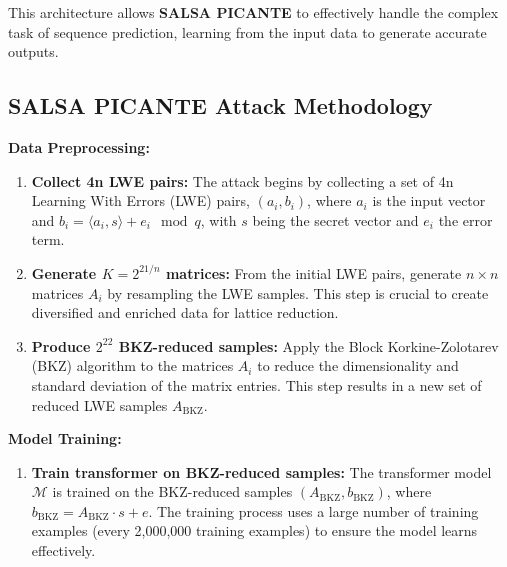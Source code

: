 \documentclass{article}
\begin{document}
This architecture allows \textbf{SALSA PICANTE} to effectively handle the complex task of sequence prediction, learning from the input data to generate accurate outputs.

\newpage 

\subsection*{SALSA PICANTE Attack Methodology}

\textbf{Data Preprocessing:}
\begin{enumerate}
    \item \textbf{Collect 4n LWE pairs:} The attack begins by collecting a set of 4n Learning With Errors (LWE) pairs, \((a_i, b_i)\), where \(a_i\) is the input vector and \(b_i = \langle a_i, s \rangle + e_i \mod q\), with \(s\) being the secret vector and \(e_i\) the error term.
    \item \textbf{Generate \(K = 2^{21/n}\) matrices:} From the initial LWE pairs, generate \(n \times n\) matrices \(A_i\) by resampling the LWE samples. This step is crucial to create diversified and enriched data for lattice reduction.
    \item \textbf{Produce \(2^{22}\) BKZ-reduced samples:} Apply the Block Korkine-Zolotarev (BKZ) algorithm to the matrices \(A_i\) to reduce the dimensionality and standard deviation of the matrix entries. This step results in a new set of reduced LWE samples \(A_{\text{BKZ}}\).
\end{enumerate}

\textbf{Model Training:}
\begin{enumerate}
    \item \textbf{Train transformer on BKZ-reduced samples:} The transformer model \(\mathcal{M}\) is trained on the BKZ-reduced samples \((A_{\text{BKZ}}, b_{\text{BKZ}})\), where \(b_{\text{BKZ}} = A_{\text{BKZ}} \cdot s + e\). The training process uses a large number of training examples (every 2,000,000 training examples) to ensure the model learns effectively.
\end{enumerate}
\end{document}
